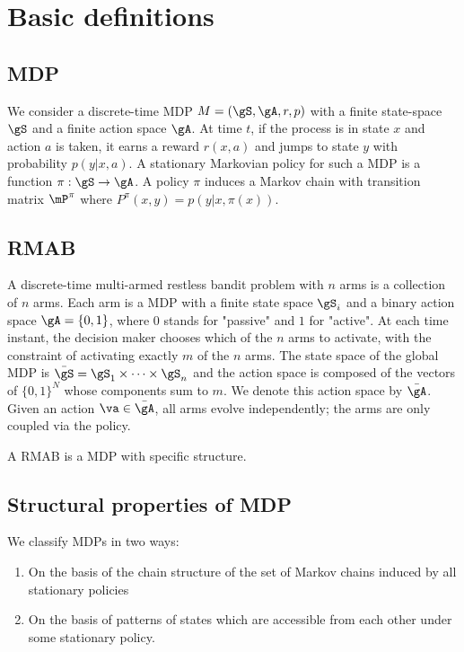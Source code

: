 \section{Basic definitions}

\subsection{MDP}

We consider a discrete-time MDP $M=(\gS,\gA,r,p)$ with a finite state-space $\gS$ and a finite action space $\gA$. At time $t$, if the process is in state $x$ and action $a$ is taken, it earns a reward $r(x,a)$ and jumps to state $y$ with probability $p(y|x,a)$. A stationary Markovian policy for such a MDP is a function $\pi:\gS\to\gA$. A policy $\pi$ induces a Markov chain with transition matrix $\mP^\pi$ where $P^\pi(x,y) = p(y | x, \pi(x))$. 

\subsection{RMAB}

A discrete-time multi-armed restless bandit problem with $n$ arms is a collection of $n$ arms. Each arm is a MDP with a finite state space $\gS_i$ and a binary action space $\gA=\{0,1\}$, where $0$ stands for "passive" and $1$ for "active". At each time instant, the decision maker chooses which of the $n$ arms to activate, with the constraint of activating exactly $m$ of the $n$ arms. The state space of the global MDP is $\bar{\gS} = \gS_1\times\dots\times\gS_n$ and the action space is composed of the vectors of $\{0,1\}^N$ whose components sum to $m$. We denote this action space by $\bar{\gA}$.  Given an action $\va\in\bar{\gA}$, all arms evolve independently; the arms are only coupled via the policy.

A RMAB is a MDP with specific structure. 

\subsection{Structural properties of MDP}

We classify MDPs in two ways:

\begin{enumerate}
    \item On the basis of the chain structure of the set of Markov chains induced by all stationary policies
    \item On the basis of patterns of states which are accessible from each other under some stationary policy.
\end{enumerate}


